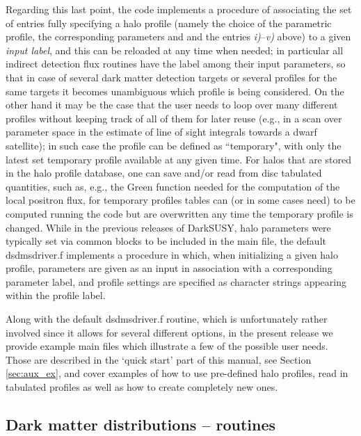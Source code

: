 \documentclass[a4paper,10pt,oneside]{book}
\newcommand{\code}[1]{\ft{#1}}
\newcommand{\ds}{{\sffamily DarkSUSY}}
\newcommand{\ft}[1]{\textsf{#1}}
\begin{document}
Regarding this last point, the code implements a procedure of associating the set of entries fully specifying a halo 
profile (namely the choice of the parametric profile, the corresponding parameters and and the entries {\sl i)}--{\sl v)} above) to a given {\it input 
label}, and this can be reloaded at any time when needed; in particular all indirect detection flux routines have the label among their 
input parameters, so that in case of several dark matter detection targets or several profiles for the same targets it becomes unambiguous 
which profile is being considered. On the other hand it may be the case that the user needs to loop over many different profiles without 
keeping track of all of them for later reuse (e.g., in a scan over parameter space in the estimate of line of sight integrals towards a 
dwarf satellite); in such case the profile can be defined as ``temporary", with only the latest set temporary profile available at any given time.
For halos that are stored in the halo profile database, one can save and/or read from disc tabulated quantities, such as, e.g., the Green 
function needed for the computation of the local positron flux, for temporary profiles tables can (or in some cases need) to be computed 
running the code but are overwritten any time the temporary profile is changed. While in the previous releases of \ds,  halo parameters 
were typically set via common blocks to be included in the main file, the default \code{dsdmsdriver.f} implements a procedure in which,
when initializing a given halo profile, parameters are given as an input in association with a corresponding parameter label, and profile 
settings are specified as character strings appearing within the profile label. 

Along with the default \code{dsdmsdriver.f} routine, which is unfortunately rather involved since it 
allows for several different options, in the present release we provide example main files which illustrate 
a few of the possible user needs.
Those are described in the `quick start' part of this manual, see Section \ref{sec:aux_ex}, and cover 
examples of how to use pre-defined halo profiles, read in tabulated profiles as well as how to create
completely new ones.

 

\subsection{Dark matter distributions -- routines}
\end{document}
